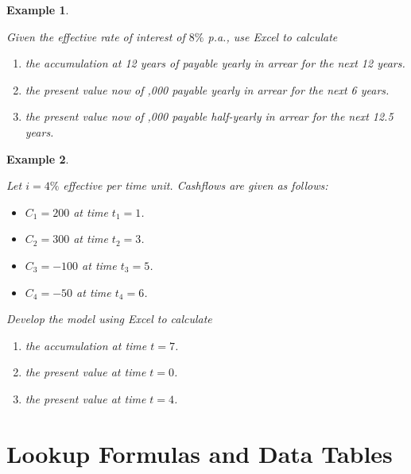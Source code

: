 \documentclass[
]{article}
\theoremstyle{definition}
\theoremstyle{definition}
\newtheorem{example}{Example}[section]
\theoremstyle{definition}
\theoremstyle{definition}
\theoremstyle{remark}
\begin{document}
\begin{example}
\protect\hypertarget{exm:unlabeled-div-7}{}\label{exm:unlabeled-div-7}

\emph{Given the effective rate of interest of \(8\%\) p.a., use
Excel to calculate}

\begin{enumerate}
\def\labelenumi{\arabic{enumi}.}
\item
  \emph{the accumulation at 12 years of payable yearly in arrear for the
  next 12 years.}
\item
  \emph{the present value now of ,000 payable yearly in arrear for the next
  6 years.}
\item
  \emph{the present value now of ,000 payable half-yearly in arrear for the
  next 12.5 years.}
\end{enumerate}

\end{example}

\begin{example}
\protect\hypertarget{exm:unlabeled-div-8}{}\label{exm:unlabeled-div-8}

\emph{Let \(i = 4\%\) effective per time unit. Cashflows are
given as follows:}

\begin{itemize}
\item
  \emph{\(C_1 = 200\) at time \(t_1 = 1\).}
\item
  \emph{\(C_2 = 300\) at time \(t_2 = 3\).}
\item
  \emph{\(C_3 = -100\) at time \(t_3 = 5\).}
\item
  \emph{\(C_4 = -50\) at time \(t_4 = 6\).}
\end{itemize}

\emph{Develop the model using Excel to calculate}

\begin{enumerate}
\def\labelenumi{\arabic{enumi}.}
\item
  \emph{the accumulation at time \(t = 7\).}
\item
  \emph{the present value at time \(t = 0\).}
\item
  \emph{the present value at time \(t = 4\).}
\end{enumerate}

\end{example}

\hypertarget{lookup-formulas-and-data-tables}{%
\section{Lookup Formulas and Data Tables}\label{lookup-formulas-and-data-tables}}
\end{document}
